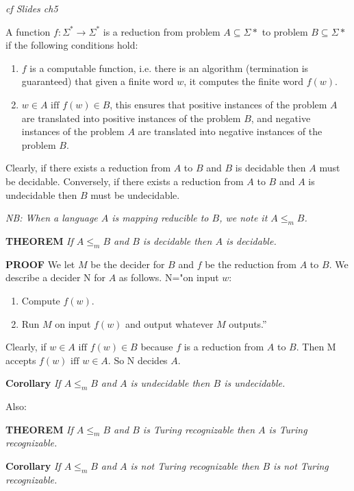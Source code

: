 \documentclass[main.tex]{subfiles}
\begin{document}
\emph{cf Slides ch5}
\begin{mytheo*}{}
A function $f:\Sigma^* \rightarrow \Sigma^*$ is a reduction from problem $A \subseteq \Sigma*$ to problem $B \subseteq \Sigma*$ if the following conditions hold:
\begin{enumerate}
    \item $f$ is a computable function, i.e. there is an algorithm (termination is guaranteed) that given a finite word $w$, it computes the finite word $f(w)$.

    \item $w \in A \text{ iff } f(w) \in B$, this ensures that positive instances of the problem $A$ are translated into positive instances of the problem $B$, and negative instances of the problem $A$ are translated into negative instances of the problem $B$.
\end{enumerate}{}
Clearly, if there exists a reduction from $A$ to $B$ and $B$ is decidable then $A$ must be
decidable.
Conversely, if there exists a reduction from $A$ to $B$ and $A$ is undecidable then $B$
must be undecidable.
\end{mytheo*}

\emph{NB: When a language $A$ is mapping reducible to $B$, we note it $A \leq_m B$.}

\textbf{THEOREM} \textit{If $A \leq_m B$ and $B$ is decidable then $A$ is decidable.}
\par\textbf{PROOF}
We let $M$ be the decider for $B$ and $f$ be the reduction from $A$ to $B$.
We describe a decider N for $A$ as follows.
N="on input $w$:
\begin{enumerate}
    \item Compute $f(w)$.
    \item Run $M$ on input $f(w)$ and output whatever $M$ outputs.”
\end{enumerate}{}

Clearly, if $w \in A \text{ iff } f(w) \in B$ because $f$ is a reduction from $A$ to $B$. Then M accepts $f(w) \text{ iff } w \in A$. So N decides $A$.


\textbf{Corollary} \textit{If $A \leq_m B$ and $A$ is undecidable then $B$ is undecidable.}

Also:

\textbf{THEOREM} \textit{If $A \leq_m B$ and $B$ is Turing recognizable then $A$ is Turing recognizable.}

\textbf{Corollary} \textit{If $A \leq_m B$ and $A$ is not Turing recognizable then $B$ is not Turing recognizable.}
\end{document}
